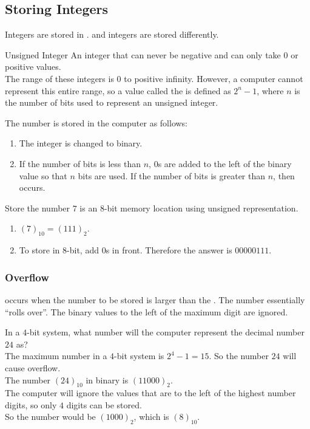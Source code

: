\documentclass[\main/notes.tex]{subfiles}
\begin{document}
			\subsection{Storing Integers}
				Integers are stored in .  and  integers are stored differently.
				\begin{definition}{Unsigned Integer}
					An integer that can never be negative and can only take $0$ or positive values.\\
					The range of these integers is $0$ to positive infinity. However, a computer cannot represent this entire range, so a value called the  is defined as $2^{n} - 1$, where $n$ is the number of bits used to represent an unsigned integer.
				\end{definition}
				The number is stored in the computer as follows:
				\begin{enumerate}
					\item The integer is changed to binary.
					\item If the number of bits is less than $n$, $0$s are added to the left of the binary value so that $n$ bits are used. If the number of bits is greater than $n$, then  occurs.
				\end{enumerate}
				\begin{example}
					Store the number $7$ is an $8$-bit memory location using unsigned representation.
					\begin{enumerate}
						\item $(7)_{10} = (111)_{2}$.
						\item To store in $8$-bit, add $0$s in front. Therefore the answer is $00000111$.
					\end{enumerate}
				\end{example}
				\subsubsection{Overflow}
					 occurs when the number to be stored is larger than the . The number essentially ``rolls over''. The binary values to the left of the maximum digit are ignored.
					\begin{example}
						In a $4$-bit system, what number will the computer represent the decimal number $24$ as?\\
						The maximum number in a $4$-bit system is $2^{4} - 1 = 15$. So the number $24$ will cause overflow.\\
						The number $(24)_{10}$ in binary is $(11000)_{2}$.\\
						The computer will ignore the values that are to the left of the highest number digits, so only $4$ digits can be stored.\\
						So the number would be $(1000)_{2}$, which is $(8)_{10}$.
					\end{example}
\end{document}
